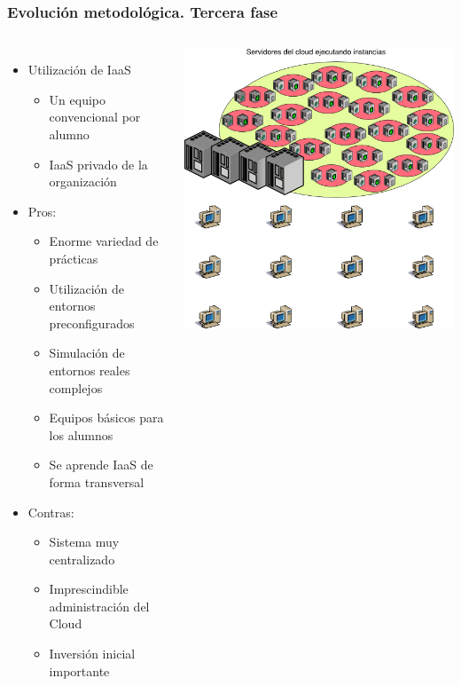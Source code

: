 \documentclass{beamer}
\begin{document}
\begin{frame}
  \frametitle{Evolución metodológica. Tercera fase}
  \begin{columns}
    \begin{itemize}
    \item Utilización de IaaS
      \begin{itemize}
      \item Un equipo convencional por alumno
      \item IaaS privado de la organización
      \end{itemize}
      \item Pros:
      \begin{itemize}
      \item Enorme variedad de prácticas
      \item Utilización de entornos preconfigurados
      \item Simulación de entornos reales complejos
      \item Equipos básicos para los alumnos
      \item Se aprende IaaS de forma transversal
      \end{itemize}
      \item Contras:
      \begin{itemize}
      \item Sistema muy centralizado
      \item Imprescindible administración del Cloud
      \item Inversión inicial importante
      \end{itemize}
    \end{itemize}
    \includegraphics[width=\columnwidth]{../img/epoca3.png}
  \end{columns}
\end{frame}
\end{document}
